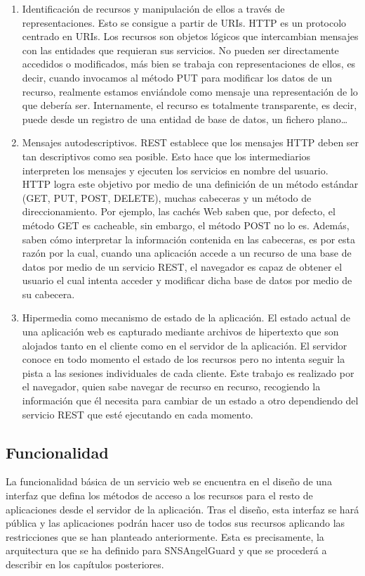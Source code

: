 \begin{enumerate}
\item Identificación de recursos y manipulación de ellos a través de representaciones. Esto se consigue a partir de URIs. HTTP es un protocolo centrado en URIs. Los recursos son objetos lógicos que intercambian mensajes con las entidades que requieran sus servicios. No pueden ser directamente accedidos o modificados, más bien se trabaja con representaciones de ellos, es decir, cuando invocamos al método PUT para modificar los datos de un recurso, realmente estamos enviándole como mensaje una representación de lo que debería ser. Internamente, el recurso es totalmente transparente, es decir, puede desde un registro de una entidad de base de datos, un fichero plano…
\bigskip
\par
\item Mensajes autodescriptivos. REST establece que los mensajes HTTP deben ser tan descriptivos como sea posible. Esto hace que los intermediarios interpreten los mensajes y ejecuten los servicios en nombre del usuario. HTTP logra este objetivo por medio de una definición de un método estándar (GET, PUT, POST, DELETE), muchas cabeceras y un método de direccionamiento. Por ejemplo, las cachés Web saben que, por defecto, el método GET es cacheable, sin embargo, el método POST no lo es. Además, saben cómo interpretar la información contenida en las cabeceras, es por esta razón por la cual, cuando una aplicación accede a un recurso de una base de datos por medio de un servicio REST, el navegador es capaz de obtener el usuario el cual intenta acceder y modificar dicha base de datos por medio de su cabecera.
\bigskip
\par
\item Hipermedia como mecanismo de estado de la aplicación. El estado actual de una aplicación web es capturado mediante archivos de hipertexto que son alojados tanto en el cliente como en el servidor de la aplicación. El servidor conoce en todo momento el estado de los recursos pero no intenta seguir la pista a las sesiones individuales de cada cliente. Este trabajo es realizado por el navegador, quien sabe navegar de recurso en recurso, recogiendo la información que él necesita para cambiar de un estado a otro dependiendo del servicio REST que esté ejecutando en cada momento.
\end{enumerate}
\subsection{Funcionalidad}
La funcionalidad básica de un servicio web se encuentra en el diseño de una interfaz que defina los métodos de acceso a los recursos para el resto de aplicaciones desde el servidor de la aplicación. Tras el diseño, esta interfaz se hará pública y las aplicaciones  podrán hacer uso de todos sus recursos aplicando las restricciones que se han planteado anteriormente. 
Esta es precisamente, la arquitectura que se ha definido para SNSAngelGuard y que se procederá a describir en los capítulos posteriores.